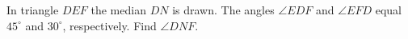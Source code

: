 In triangle $DEF$ the median $DN$ is drawn. The angles $\angle EDF$ and $\angle EFD$ equal $45^{\circ}$ and $30^{\circ}$, respectively. Find $\angle DNF$.
